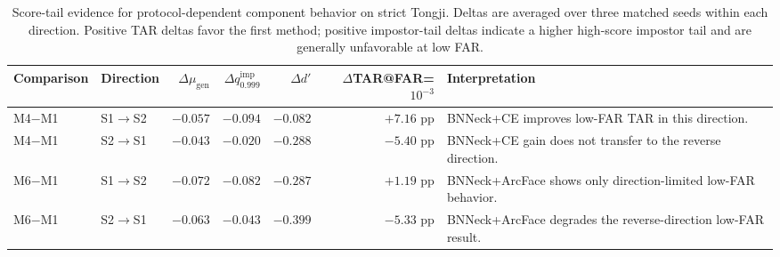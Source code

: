 \begin{table}[t]
\centering
\caption{Score-tail evidence for protocol-dependent component behavior on strict Tongji. Deltas are averaged over three matched seeds within each direction. Positive TAR deltas favor the first method; positive impostor-tail deltas indicate a higher high-score impostor tail and are generally unfavorable at low FAR.}
\label{tab:strict_tongji_failure_tail}
\small
\setlength{\tabcolsep}{3pt}
\begin{tabular}{llrrrrp{}}
\toprule
Comparison & Direction & $\Delta\mu_{\mathrm{gen}}$ & $\Delta q^{\mathrm{imp}}_{0.999}$ & $\Delta d'$ & $\Delta$TAR@FAR=$10^{-3}$ & Interpretation \\
\midrule
M4$-$M1 & S1$\rightarrow$S2 & $-0.057$ & $-0.094$ & $-0.082$ & $+7.16$ pp & BNNeck+CE improves low-FAR TAR in this direction. \\
M4$-$M1 & S2$\rightarrow$S1 & $-0.043$ & $-0.020$ & $-0.288$ & $-5.40$ pp & BNNeck+CE gain does not transfer to the reverse direction. \\
M6$-$M1 & S1$\rightarrow$S2 & $-0.072$ & $-0.082$ & $-0.287$ & $+1.19$ pp & BNNeck+ArcFace shows only direction-limited low-FAR behavior. \\
M6$-$M1 & S2$\rightarrow$S1 & $-0.063$ & $-0.043$ & $-0.399$ & $-5.33$ pp & BNNeck+ArcFace degrades the reverse-direction low-FAR result. \\
\bottomrule
\end{tabular}
\end{table}
